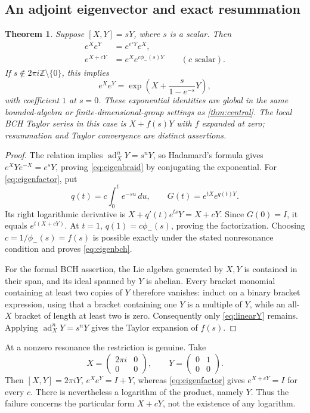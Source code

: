 \documentclass[11pt]{article}
\numberwithin{equation}{section}
\newtheorem{theorem}{Theorem}[section]
\theoremstyle{definition}
\theoremstyle{remark}
\DeclareMathOperator{\ad}{ad}
\newcommand{\Z}{\mathbb{Z}}
\begin{document}
\subsection{An adjoint eigenvector and exact resummation}
\begin{theorem}\label{thm:eigen}
Suppose $[X,Y]=sY$, where $s$ is a scalar. Then
\begin{align}
 e^Xe^Y&=e^{e^sY}e^X,\label{eq:eigenbraid}\\
 e^{X+cY}&=e^X e^{c\phi_-(s)Y}\qquad(c\text{ scalar}).
 \label{eq:eigenfactor}
\end{align}
If $s\notin2\pi i\Z\setminus\{0\}$, this implies
\begin{equation}\label{eq:eigenbch}
 e^Xe^Y=\exp\left(X+\frac{s}{1-e^{-s}}Y\right),
\end{equation}
with coefficient $1$ at $s=0$. These exponential identities are
global in the same bounded-algebra or finite-dimensional-group
settings as \cref{thm:central}. The local BCH Taylor series in this
case is $X+f(s)Y$ with $f$ expanded at zero; resummation and Taylor
convergence are distinct assertions.
\end{theorem}
\begin{proof}
The relation implies $\ad_X^nY=s^nY$, so Hadamard's formula gives
$e^XYe^{-X}=e^sY$, proving \eqref{eq:eigenbraid} by conjugating the
exponential. For \eqref{eq:eigenfactor}, put
\[
 q(t)=c\int_0^t e^{-su}\,du,
 \qquad G(t)=e^{tX}e^{q(t)Y}.
\]
Its right logarithmic derivative is
$X+q'(t)e^{ts}Y=X+cY$. Since $G(0)=I$, it equals
$e^{t(X+cY)}$. At $t=1$, $q(1)=c\phi_-(s)$, proving the
factorization. Choosing $c=1/\phi_-(s)=f(s)$ is possible exactly
under the stated nonresonance condition and proves
\eqref{eq:eigenbch}.

For the formal BCH assertion, the Lie algebra generated by $X,Y$
is contained in their span, and its ideal spanned by $Y$ is abelian.
Every bracket monomial containing at least two copies of $Y$
therefore vanishes: induct on a binary bracket expression, using
that a bracket containing one $Y$ is a multiple of $Y$, while an
all-$X$ bracket of length at least two is zero. Consequently only
\eqref{eq:linearY} remains. Applying $\ad_X^nY=s^nY$ gives the
Taylor expansion of $f(s)$.
\end{proof}
At a nonzero resonance the restriction is genuine. Take
\[
 X=\begin{pmatrix}2\pi i&0\\0&0\end{pmatrix},\qquad
 Y=\begin{pmatrix}0&1\\0&0\end{pmatrix}.
\]
Then $[X,Y]=2\pi iY$, $e^Xe^Y=I+Y$, whereas
\eqref{eq:eigenfactor} gives $e^{X+cY}=I$ for every $c$.
There is nevertheless a logarithm of the product, namely $Y$.
Thus the failure concerns the particular form $X+cY$, not the
existence of any logarithm.
\end{document}
